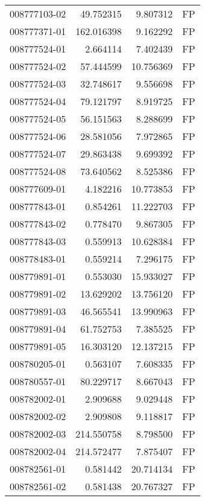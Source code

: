 \begin{tabular}{lrrl}
008777103-02 &   49.752315 &       9.807312 &   FP \\
008777371-01 &  162.016398 &       9.162292 &   FP \\
008777524-01 &    2.664114 &       7.402439 &   FP \\
008777524-02 &   57.444599 &      10.756369 &   FP \\
008777524-03 &   32.748617 &       9.556698 &   FP \\
008777524-04 &   79.121797 &       8.919725 &   FP \\
008777524-05 &   56.151563 &       8.288699 &   FP \\
008777524-06 &   28.581056 &       7.972865 &   FP \\
008777524-07 &   29.863438 &       9.699392 &   FP \\
008777524-08 &   73.640562 &       8.525386 &   FP \\
008777609-01 &    4.182216 &      10.773853 &   FP \\
008777843-01 &    0.854261 &      11.222703 &   FP \\
008777843-02 &    0.778470 &       9.867305 &   FP \\
008777843-03 &    0.559913 &      10.628384 &   FP \\
008778483-01 &    0.559214 &       7.296175 &   FP \\
008779891-01 &    0.553030 &      15.933027 &   FP \\
008779891-02 &   13.629202 &      13.756120 &   FP \\
008779891-03 &   46.565541 &      13.990963 &   FP \\
008779891-04 &   61.752753 &       7.385525 &   FP \\
008779891-05 &   16.303120 &      12.137215 &   FP \\
008780205-01 &    0.563107 &       7.608335 &   FP \\
008780557-01 &   80.229717 &       8.667043 &   FP \\
008782002-01 &    2.909688 &       9.029448 &   FP \\
008782002-02 &    2.909808 &       9.118817 &   FP \\
008782002-03 &  214.550758 &       8.798500 &   FP \\
008782002-04 &  214.572477 &       7.875407 &   FP \\
008782561-01 &    0.581442 &      20.714134 &   FP \\
008782561-02 &    0.581438 &      20.767327 &   FP \\

\end{tabular}
